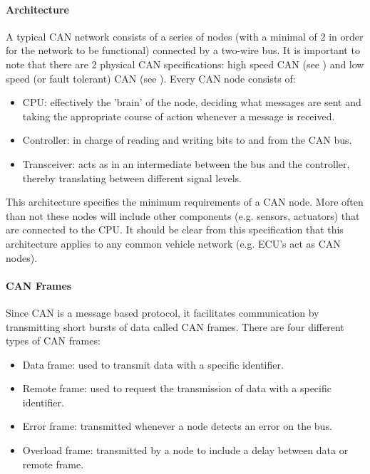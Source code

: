 \documentclass[11pt]{article}
\begin{document}
\paragraph{Architecture}

A typical CAN network consists of a series of nodes (with a minimal of 2 in order for the network to be functional) connected by a two-wire bus. It is important to note that there are 2 physical CAN specifications: high speed CAN (see \cite{ISO11898-2}) and low speed (or fault tolerant) CAN (see \cite{ISO11898-3}). Every CAN node consists of:
\begin{itemize}
	\item CPU: effectively the 'brain' of the node, deciding what messages are sent and taking the appropriate course of action whenever a message is received.
	\item Controller: in charge of reading and writing bits to and from the CAN bus.
	\item Transceiver: acts as in an intermediate between the bus and the controller, thereby translating between different signal levels.
\end{itemize}

This architecture specifies the minimum requirements of a CAN node. More often than not these nodes will include other components (e.g. sensors, actuators) that are connected to the CPU. It should be clear from this specification that this architecture applies to any common vehicle network (e.g. ECU's act as CAN nodes).

\paragraph{CAN Frames}

Since CAN is a message based protocol, it facilitates communication by transmitting short bursts of data called CAN frames. There are four different types of CAN frames:
\begin{itemize}
	\item Data frame: used to transmit data with a specific identifier.
	\item Remote frame: used to request the transmission of data with a specific identifier.
	\item Error frame: transmitted whenever a node detects an error on the bus.
	\item Overload frame: transmitted by a node to include a delay between data or remote frame.
\end{itemize}
\end{document}
